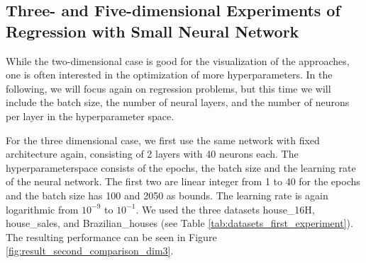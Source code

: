 \subsection{Three- and Five-dimensional Experiments of Regression with Small Neural Network}

While the two-dimensional case is good for the visualization of the approaches, one is often interested in the optimization of more hyperparameters. In the following, we will focus again on regression problems, but this time we will include the batch size, the number of neural layers, and the number of neurons per layer in the hyperparameter space. \newline 

For the three dimensional case, we first use the same network with fixed architecture again, consisting of 2 layers with 40 neurons each. The hyperparameterspace consists of the epochs, the batch size and the learning rate of the neural network. The first two are linear integer from 1 to 40 for the epochs and the batch size has 100 and 2050 as bounds. The learning rate is again logarithmic from $ 10^{-9} $ to $ 10^{-1} $. We used the three datasets house\_16H, house\_sales, and Brazilian\_houses (see Table \ref{tab:datasets_first_experiment}). The resulting performance can be seen in Figure \ref{fig:result_second_comparison_dim3}. 


